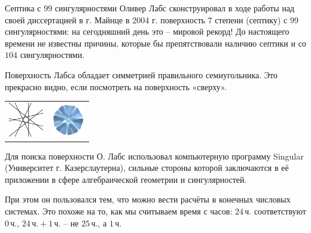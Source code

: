 \begin{surferPage}{Септика с 99 сингулярностями}
Оливер Лабс сконструировал в ходе работы над своей диссертацией в г. Майнце в 2004 г. поверхность $7$ степени (септику) с $99$ сингулярностями: на сегодняшний день это – мировой рекорд! До настоящего времени не известны причины, которые бы препятствовали наличию септики и со $104$ сингулярностями. 

Поверхность Лабса обладает симметрией правильного семиугольника. Это прекрасно видно, если посмотреть на поверхность «сверху». 
    \vspace*{-0.3em}
    \begin{center}
      \begin{tabular}{c@{\qquad}c}
        \includegraphics[height=1.5cm]{./../../common/images/labsseptic1.pdf}
        &
        \includegraphics[height=1.5cm]{./../../common/images/labs_septic_von_oben}
      \end{tabular}
    \end{center}
    \vspace*{-0.3em}

Для поиска поверхности О. Лабс использовал компьютерную программу {\sc Singular} (Университет г. Казерслаутерна), сильные стороны которой заключаются в её приложении в сфере алгебраической геометрии и сингулярностей.

При этом он пользовался тем, что можно вести расчёты в конечных числовых системах. Это похоже на то, как мы считываем время с часов: $24\,$ч. соответствуют $0\,$ч., $24\,\text{ч}. + 1\,$ч. – не $25\,$ч., а $1\,$ч.
\end{surferPage}
